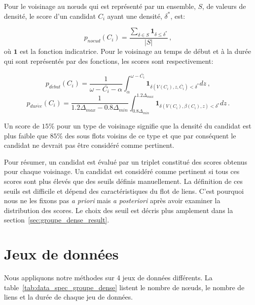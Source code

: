 Pour le voisinage au n\oe uds qui est représenté par un ensemble, $S$, de valeurs de densité, le score d'un candidat $C_i$ ayant une densité, $\delta^*$, est:

\begin{equation}
p_{noeud}(C_i)= \dfrac{\sum_{\delta \in S} \mathbf{1}_{\delta \le \delta^*}}{|S|}\,,
\end{equation}
où $\mathbf{1}$ est la fonction indicatrice.
Pour le voisinage au temps de début et à la durée qui sont représentés par des fonctions, les scores sont respectivement:

\begin{equation}
p_{d\acute{e}but}(C_i)=\dfrac{1}{\omega-\bar{C_i} - \alpha} \int_{\alpha}^{\omega- \bar{C_i}} \mathbf{1}_{\delta(V(C_i),z,\bar{C_i}) <\delta^*} dz \ ,
\end{equation} 
\begin{equation}
p_{dur\acute{e}e}(C_i)=\dfrac{1}{1.2\Delta_{max} - 0.8\Delta_{min}} \int_{0.8\Delta_{min}}^{1.2\Delta_{max}} \mathbf{1}_{\delta(V(C_i),\beta(C_i),z) <\delta^*} dz \, .
\end{equation}

Un score de $15\%$ pour un type de voisinage signifie que la densité du candidat est plus faible que $85\%$ des sous flots voisins de ce type et que par conséquent le candidat ne devrait pas être considéré comme pertinent.

\bigskip
Pour résumer, un candidat est évalué par un triplet constitué des scores obtenus pour chaque voisinage.
Un candidat est considéré comme pertinent si tous ces scores sont plus élevés que des seuils définis manuellement.
La définition de ces seuils est difficile et dépend des caractéristiques du flot de liens.
C'est pourquoi nous ne les fixons pas \emph{a priori} mais \emph{a posteriori} après avoir examiner la distribution des scores.
Le choix des seuil est décris plus amplement dans la section~\ref{sec:groupe_dense_result}.


\section{Jeux de données}
\label{sec:groupe_dense_data}
Nous appliquons notre méthodes sur 4 jeux de données différents.
La table~\ref{tab:data_spec_groupe_dense} listent le nombre de n\oe uds, le nombre de liens et la durée de chaque jeu de données.

